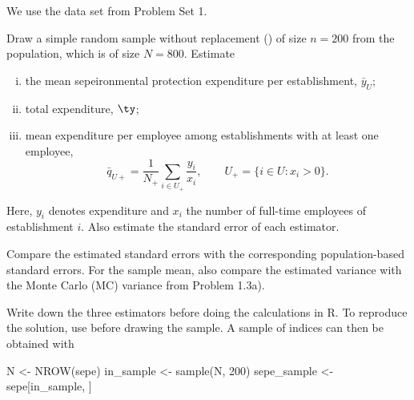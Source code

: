 



\begin{Problem}
    We use the data set  from Problem Set 1.

\begin{Subtask}
    \item Draw a simple random sample without replacement (\SRS) of size $n =
        200$ from the  population, which is of size $N = 800$.
        Estimate
        \begin{enumerate}[i)]
            \item the mean sepeironmental protection expenditure per
                establishment, $\bar{y}_U$;
            \item total expenditure, $\ty$;
            \item mean expenditure per employee among establishments with at
                least one employee,
                \begin{equation*}
                    \bar{q}_{U+} = \frac{1}{N_+}\sum_{i \in U_+}\frac{y_i}{x_i},
                    \qquad
                    U_+ = \{i \in U:x_i>0\}.
                \end{equation*}
        \end{enumerate}
        Here, $y_i$ denotes expenditure and $x_i$ the number of full-time
        employees of establishment $i$. Also estimate the standard error of
        each estimator.

        Compare the estimated standard errors with the corresponding
        population-based standard errors. For the sample mean, also compare
        the estimated variance with the Monte Carlo (MC) variance from Problem
        1.3a).

        \begin{Rhint}
            Write down the three estimators before doing the calculations in R.
            To reproduce the solution, use  before drawing
            the sample. A sample of indices can then be obtained with

\begin{Scode}
N <- NROW(sepe)
in_sample <- sample(N, 200)
sepe_sample <- sepe[in_sample, ]
\end{Scode}
        \end{Rhint}


\end{Subtask}
\end{Problem}
